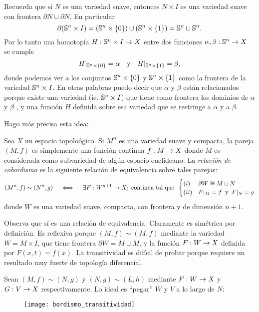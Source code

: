 \documentclass[../../topologia_algebraica]{subfiles}
\begin{document}
Recuerda que si $N$ es una variedad suave, entonces $N\times I$ es una variedad suave con frontera
$\partial N \sqcup \partial N$. En particular
\[
  \partial(\mathbb{S}^n\times I)=(\mathbb{S}^n\times\{0\})\cup(\mathbb{S}^n\times\{1\})=\mathbb{S}^n \sqcup \mathbb{S}^n.
\]
Por lo
tanto una homotop\'ia $H:\mathbb{S}^n\times I\rightarrow X$ entre dos funciones $\alpha,\beta:\mathbb{S}^n\rightarrow X$ se
cumple
\[
  H|_{\mathbb{S}^n\times\{0\}}=\alpha \quad\text{y}\quad H|_{\mathbb{S}^n\times\{1\}}=\beta,
\]
donde podemos ver a los conjuntos $\mathbb{S}^n\times\{0\}$ y $\mathbb{S}^n\times\{1\}$ como la frontera de la
variedad $\mathbb{S}^n\times I$. En otras palabras puedo decir que $\alpha$ y $\beta$ est\'an relacionados
porque existe una variedad (ie. $\mathbb{S}^n\times I$) que tiene como frontera los dominios de $\alpha$
y $\beta$ , y una funci\'on $H$ definida sobre esa variedad que se restringe a $\alpha$ y a $\beta$.

Hago m\'as precisa esta idea:

\begin{defin}
  Sea $X$ un espacio topolo\'ogico. Si $M^n$ es una variedad suave y compacta, la pareja $(M,f)$
  es simplemente una funci\'on continua $f:M\rightarrow X$ donde $M$ es considerada como subvariedad
  de alg\'un espacio euclideano. La \emph{relaci\'on de cobordismo} es la siguiente relaci\'on
  de equivalencia sobre tales parejas:
  \[
    (M^n,f)\sim(N^n,g) \quad\iff\quad
    \exists F:W^{n+1}\rightarrow X;\;\text{continua tal que}\;\;
    \begin{cases}
      (i)& \partial W\cong M\sqcup N \\
      (ii)& F|_{M}=f \;\;\text{y}\;\; F|_{N}=g
    \end{cases}
  \]
  donde $W$ es una variedad suave, compacta, con frontera y de dimensi\'on $n+1$.
\end{defin}

Observa que s\'i es una relaci\'on de equivalencia. Claramente es sim\'etrica por definici\'on.
Es reflexiva porque $(M,f)\sim(M,f)$ mediante la variedad $W=M\times I$, que tiene frontera
$\partial W=M\sqcup M$, y la funci\'on $F:W\rightarrow X$ definida por $F(x,t)=f(x)$.
La transitividad es dif\'icil de probar porque requiere un resultado muy fuerte de
topolog\'ia diferencial.

Sean $(M,f)\sim(N,g)$ y $(N,g)\sim(L,h)$ mediante $F:W\rightarrow X$ y $G:V\rightarrow X$ respectivamente.
Lo ideal es ``pegar'' $W$ y $V$ a lo largo de $N$:

\begin{figure}[ht] %
  \centering
  \texttt{[image: bordismo\_transitividad]}
\end{figure} %
\end{document}
